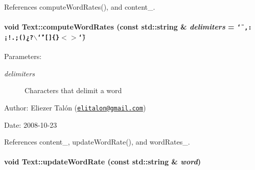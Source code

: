 References computeWordRates(), and content\_\-.\hypertarget{class_text_e954a35628c72537e2ee5ca6e9609ac1}{
\paragraph[computeWordRates]{\setlength{\rightskip}{0pt plus 5cm}void Text::computeWordRates (const std::string \& {\em delimiters} = {\tt \char`\"{}~,:¡!.;()¿?$\backslash$\char`\"{}'\mbox{[}\mbox{]}\{\}$<$$>$\char`\"{}})}\hfill}
\label{class_text_e954a35628c72537e2ee5ca6e9609ac1}


\begin{Desc}
\item[Parameters:]
\begin{description}
\item[{\em delimiters}]Characters that delimit a word\end{description}
\end{Desc}
\begin{Desc}
\item[Author:]Eliezer Talón (\href{mailto:elitalon@gmail.com}{\tt elitalon@gmail.com}) \end{Desc}
\begin{Desc}
\item[Date:]2008-10-23 \end{Desc}


References content\_\-, updateWordRate(), and wordRates\_\-.\hypertarget{class_text_5ab8f9bfa566de537a167991fe10eff5}{
\paragraph[updateWordRate]{\setlength{\rightskip}{0pt plus 5cm}void Text::updateWordRate (const std::string \& {\em word})}\hfill}
\label{class_text_5ab8f9bfa566de537a167991fe10eff5}



